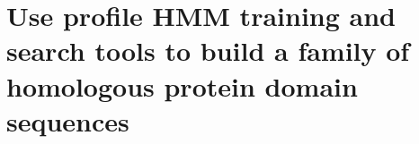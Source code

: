 \chapter{Use profile HMM training and search tools to build a family of homologous protein domain sequences}
